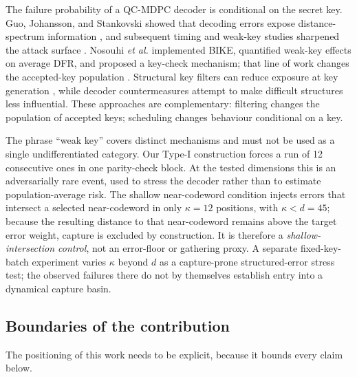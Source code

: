 \documentclass[lettersize,journal]{IEEEtran}
\begin{document}
The failure probability of a QC-MDPC decoder is conditional on the secret key. Guo, Johansson, and Stankovski showed that decoding errors expose distance-spectrum information \cite{guo2016key}, and subsequent timing and weak-key studies sharpened the attack surface \cite{eaton2018timing,wang2023weak,gellersen2025}. Nosouhi \emph{et al.} implemented BIKE, quantified weak-key effects on average DFR, and proposed a key-check mechanism; that line of work changes the accepted-key population \cite{nosouhi2023weakkey}. Structural key filters can reduce exposure at key generation \cite{matthews2025combinatorial}, while decoder countermeasures attempt to make difficult structures less influential. These approaches are complementary: filtering changes the population of accepted keys; scheduling changes behaviour conditional on a key.

The phrase ``weak key'' covers distinct mechanisms and must not be used as a single undifferentiated category. Our Type-I construction forces a run of 12 consecutive ones in one parity-check block. At the tested dimensions this is an adversarially rare event, used to stress the decoder rather than to estimate population-average risk. The shallow near-codeword condition injects errors that intersect a selected near-codeword in only $\kappa=12$ positions, with $\kappa<d=45$; because the resulting distance to that near-codeword remains above the target error weight, capture is excluded by construction. It is therefore a \emph{shallow-intersection control}, not an error-floor or gathering proxy. A separate fixed-key-batch experiment varies $\kappa$ beyond $d$ as a capture-prone structured-error stress test; the observed failures there do not by themselves establish entry into a dynamical capture basin.

\subsection{Boundaries of the contribution}

The positioning of this work needs to be explicit, because it bounds every claim below.
\end{document}
